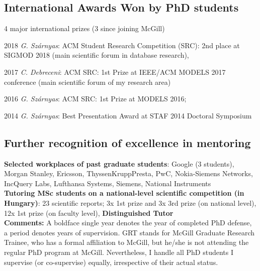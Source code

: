 \subsection{International Awards Won by PhD students}

4 major international prizes (3 since joining McGill) 
\begin{yearlist}
\item[2018] \emph{G. Sz\'arnyas}: ACM Student Research Competition (SRC): 2nd place at SIGMOD 2018 (main scientific forum in database research),
\item[2017] \emph{C. Debreceni}: ACM SRC: 1st Prize at IEEE/ACM MODELS 2017 conference (main scientific forum of my research area)
\item[2016] \emph{G. Sz\'arnyas}: ACM SRC: 1st Prize at MODELS 2016; 
\item[2014] \emph{G. Sz\'arnyas}: Best Presentation Award at STAF 2014 Doctoral Symposium
\end{yearlist}

\subsection{Further recognition of excellence in mentoring}

\textbf{Selected workplaces of past graduate students}: Google (3 students), Morgan Stanley, Ericsson, ThyssenKruppPresta, PwC, Nokia-Siemens Networks, 
IncQuery Labs, Lufthansa Systems, Siemens, National Instruments \\

\noindent
\textbf{Tutoring MSc students on a national-level scientific competition (in Hungary)}: 
23 scientific reports; 3x 1st prize and 3x 3rd prize (on national
level), 12x 1st prize (on faculty level), %
\textbf{Distinguished Tutor}  \\%

\noindent
\textbf{Comments:} A boldface single year denotes the year of completed PhD defense, a period denotes years of supervision. GRT stands for McGill Graduate Research Trainee, who has a formal affiliation to McGill, but he/she is not attending the regular PhD program at McGill. Nevertheless, I handle all PhD students I supervise (or co-supervise) equally, irrespective of their actual status. 
\\

